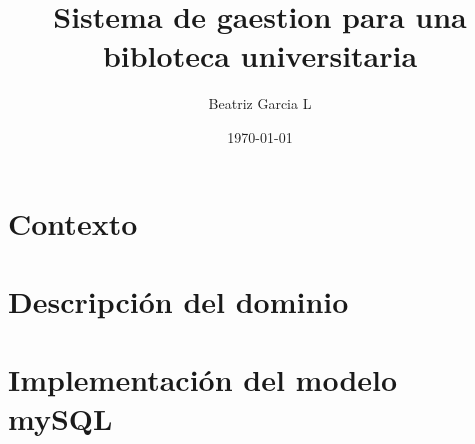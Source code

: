 


\author{Beatriz Garcia L}
\title{Sistema de gaestion para una bibloteca universitaria}
\date{\today}


\maketitle
\section{Contexto}
\section{Descripción del dominio}
\section{Implementación del modelo mySQL}
\section{}


